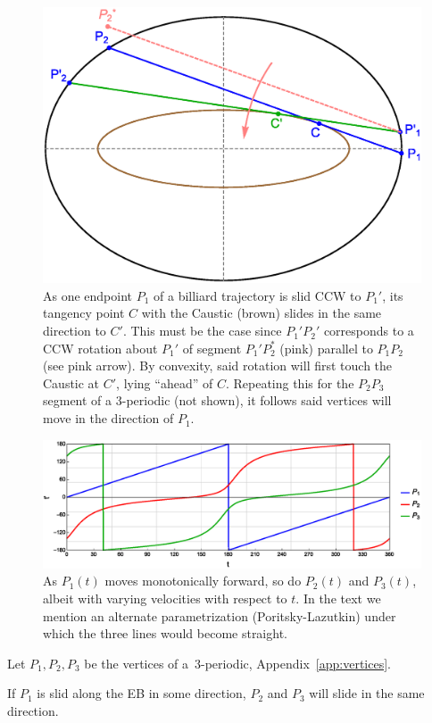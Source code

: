 \begin{figure}
    \centering
    \includegraphics[width=.5\textwidth]{pics/1090_caustic_progress.eps}
    \caption{As one endpoint $P_1$ of a billiard trajectory is slid CCW to $P_1'$, its tangency point $C$ with the Caustic (brown) slides in the same direction to $C'$. This must be the case since $P_1'P_2'$ corresponds to a CCW rotation about $P_1'$ of segment $P_1'P_2^*$ (pink) parallel to $P_1P_2$ (see pink arrow). By convexity, said rotation will first touch the Caustic at $C'$, lying ``ahead'' of $C$. Repeating this for the $P_2P_3$ segment of a 3-periodic (not shown), it follows said vertices will move in the direction of $P_1$.}
    \label{fig:caustic-progress}
\end{figure}

\begin{figure}
    \centering
    \includegraphics[width=.8\textwidth]{pics/1100_angular_progress_p1p2p3.eps}
    \caption{As $P_1(t)$ moves monotonically forward, so do $P_2(t)$ and $P_3(t)$, albeit with varying velocities with respect to $t$. In the text we mention an alternate parametrization (Poritsky-Lazutkin) under which the three lines would become straight.}
    \label{fig:ekg-p1p2p3}
\end{figure}


Let $P_1,P_2,P_3$ be the vertices of a\ 3-periodic, Appendix~\ref{app:vertices}.

\begin{proposition}
 If $P_1$ is slid along the EB in some direction, $P_2$ and $P_3$ will slide in the same direction. 
\end{proposition}

